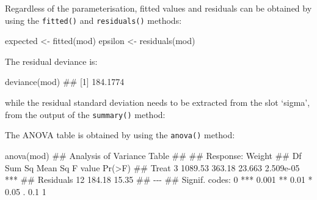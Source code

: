 \documentclass[a4paper,12pt,oneside]{book}
\newenvironment{Shaded}{\begin{snugshade}}{\end{snugshade}}
\newcommand{\SpecialCharTok}[1]{#1}
\newcommand{\DocumentationTok}[1]{#1}
\newcommand{\OtherTok}[1]{#1}
\newcommand{\FunctionTok}[1]{#1}
\newcommand{\NormalTok}[1]{#1}
\begin{document}
Regardless of the parameterisation, fitted values and residuals can be obtained by using the \texttt{fitted()} and \texttt{residuals()} methods:

\vspace{12pt}

\begin{Shaded}
\begin{Highlighting}[]
\NormalTok{expected }\OtherTok{\textless{}{-}} \FunctionTok{fitted}\NormalTok{(mod)}
\NormalTok{epsilon }\OtherTok{\textless{}{-}} \FunctionTok{residuals}\NormalTok{(mod)}
\end{Highlighting}
\end{Shaded}

The residual deviance is:

\vspace{12pt}

\begin{Shaded}
\begin{Highlighting}[]
\FunctionTok{deviance}\NormalTok{(mod)}
\DocumentationTok{\#\# [1] 184.1774}
\end{Highlighting}
\end{Shaded}

while the residual standard deviation needs to be extracted from the slot `sigma', from the output of the \texttt{summary()} method:

\vspace{12pt}

\begin{Shaded}
\end{Shaded}

The ANOVA table is obtained by using the \texttt{anova()} method:

\vspace{12pt}

\begin{Shaded}
\begin{Highlighting}[]
\FunctionTok{anova}\NormalTok{(mod)}
\DocumentationTok{\#\# Analysis of Variance Table}
\DocumentationTok{\#\# }
\DocumentationTok{\#\# Response: Weight}
\DocumentationTok{\#\#           Df  Sum Sq Mean Sq F value    Pr(\textgreater{}F)    }
\DocumentationTok{\#\# Treat      3 1089.53  363.18  23.663 2.509e{-}05 ***}
\DocumentationTok{\#\# Residuals 12  184.18   15.35                      }
\DocumentationTok{\#\# {-}{-}{-}}
\DocumentationTok{\#\# Signif. codes:  0 \textquotesingle{}***\textquotesingle{} 0.001 \textquotesingle{}**\textquotesingle{} 0.01 \textquotesingle{}*\textquotesingle{} 0.05 \textquotesingle{}.\textquotesingle{} 0.1 \textquotesingle{} \textquotesingle{} 1}
\end{Highlighting}
\end{Shaded}
\end{document}
